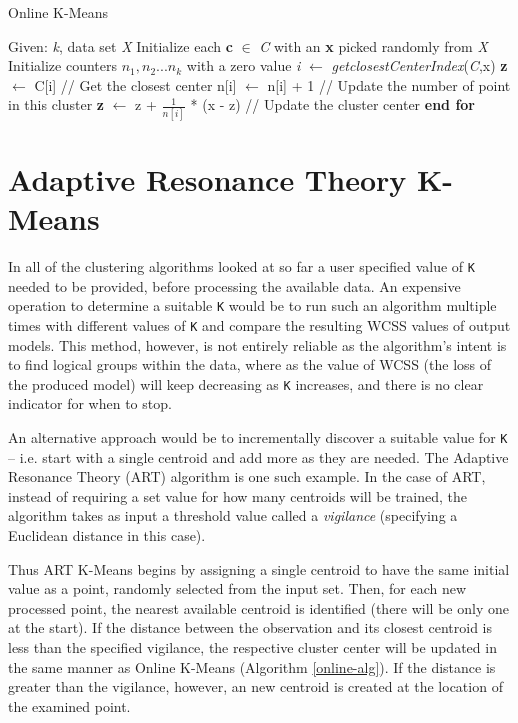 \documentclass{l4proj}
\begin{document}
\begin{algorithm}
\caption{Online K-Means}\label{online-alg}
\begin{algorithmic}[1]
\State Given: \textit{k}, data set \textit{X}
\State Initialize each \textbf{c} $\in$ \textit{C} with an \textbf{x} picked randomly from \textit{X}
\State Initialize counters $n_{1}, n_{2} ... n_{k}$ with a zero value
    \State \textit{i}  $\gets$ \textit{getclosestCenterIndex}(\textit{C},x)
    \State \textbf{z}  $\gets$ C[i] \hspace{2.25cm} // Get the closest center
    \State n[i] $\gets$ n[i] + 1 \hspace{1.3cm} // Update the number of point in this cluster
    \State \textbf{z} $\gets$ z + $\frac{1}{n[i]}$ * (x - z) \hspace{0.35cm} // Update the cluster center
\EndFor
\State \textbf{end for}
\end{algorithmic}
\end{algorithm}

\section{Adaptive Resonance Theory K-Means}

In all of the clustering algorithms looked at so far a user specified value of \texttt{K} needed to be provided, before processing the available data. An expensive operation to determine a suitable \texttt{K} would be to run such an algorithm multiple times with different values of \texttt{K} and compare the resulting WCSS values of output models. This method, however, is not entirely reliable as the algorithm's intent is to find logical groups within the data, where as the value of WCSS (the loss of the produced model) will keep decreasing as \texttt{K} increases, and there is no clear indicator for when to stop\cite{LearnK}.

An alternative approach would be to incrementally discover a suitable value for \texttt{K} -- i.e. start with a single centroid and add more as they are needed. The Adaptive Resonance Theory (ART) algorithm\cite{ART} is one such example. In the case of ART, instead of requiring a set value for how many centroids will be trained, the algorithm takes as input a threshold value called a \textit{vigilance} (specifying a Euclidean distance in this case). 

Thus ART K-Means begins by assigning a single centroid to have the same initial value as a point, randomly selected from the input set. Then, for each new processed point, the nearest available centroid is identified (there will be only one at the start). If the distance between the observation and its closest centroid is less than the specified vigilance, the respective cluster center will be updated in the same manner as Online K-Means (Algorithm \ref{online-alg}). If the distance is greater than the vigilance, however, an new centroid is created at the location of the examined point.
\end{document}

